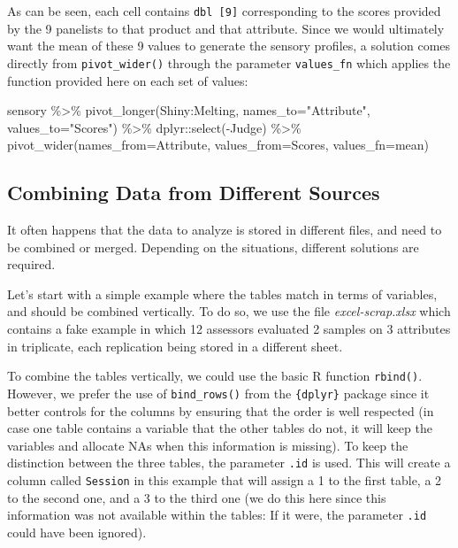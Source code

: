 \documentclass[
]{book}
\newenvironment{Shaded}{\begin{snugshade}}{\end{snugshade}}
\newcommand{\AttributeTok}[1]{\textcolor[rgb]{0.77,0.63,0.00}{#1}}
\newcommand{\FunctionTok}[1]{\textcolor[rgb]{0.00,0.00,0.00}{#1}}
\newcommand{\NormalTok}[1]{#1}
\newcommand{\SpecialCharTok}[1]{\textcolor[rgb]{0.00,0.00,0.00}{#1}}
\newcommand{\StringTok}[1]{\textcolor[rgb]{0.31,0.60,0.02}{#1}}
\begin{document}
As can be seen, each cell contains \texttt{dbl\ {[}9{]}} corresponding to the scores provided by the 9 panelists to that product and that attribute. Since we would ultimately want the mean of these 9 values to generate the sensory profiles, a solution comes directly from \texttt{pivot\_wider()} through the parameter \texttt{values\_fn} which applies the function provided here on each set of values:

\begin{Shaded}
\begin{Highlighting}[]
\NormalTok{sensory }\SpecialCharTok{\%\textgreater{}\%} 
  \FunctionTok{pivot\_longer}\NormalTok{(Shiny}\SpecialCharTok{:}\NormalTok{Melting, }\AttributeTok{names\_to=}\StringTok{"Attribute"}\NormalTok{, }\AttributeTok{values\_to=}\StringTok{"Scores"}\NormalTok{) }\SpecialCharTok{\%\textgreater{}\%} 
\NormalTok{  dplyr}\SpecialCharTok{::}\FunctionTok{select}\NormalTok{(}\SpecialCharTok{{-}}\NormalTok{Judge) }\SpecialCharTok{\%\textgreater{}\%} 
  \FunctionTok{pivot\_wider}\NormalTok{(}\AttributeTok{names\_from=}\NormalTok{Attribute, }\AttributeTok{values\_from=}\NormalTok{Scores, }\AttributeTok{values\_fn=}\NormalTok{mean)}
\end{Highlighting}
\end{Shaded}

\hypertarget{combining-data-from-different-sources}{%
\subsection{Combining Data from Different Sources}\label{combining-data-from-different-sources}}

It often happens that the data to analyze is stored in different files, and need to be combined or merged. Depending on the situations, different solutions are required.

Let's start with a simple example where the tables match in terms of variables, and should be combined vertically.
To do so, we use the file \emph{excel-scrap.xlsx} which contains a fake example in which 12 assessors evaluated 2 samples on 3 attributes in triplicate, each replication being stored in a different sheet.

To combine the tables vertically, we could use the basic R function \texttt{rbind()}. However, we prefer the use of \texttt{bind\_rows()} from the \texttt{\{dplyr\}} package since it better controls for the columns by ensuring that the order is well respected (in case one table contains a variable that the other tables do not, it will keep the variables and allocate NAs when this information is missing). To keep the distinction between the three tables, the parameter \texttt{.id} is used. This will create a column called \texttt{Session} in this example that will assign a 1 to the first table, a 2 to the second one, and a 3 to the third one (we do this here since this information was not available within the tables: If it were, the parameter \texttt{.id} could have been ignored).
\end{document}
